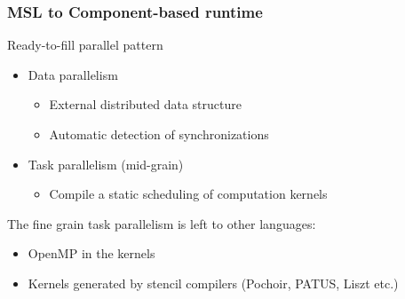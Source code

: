 \documentclass{beamer}
\begin{document}
\begin{frame}
\frametitle{MSL to Component-based runtime}
\begin{block}{Ready-to-fill parallel pattern}
\begin{itemize}
\item Data parallelism
\begin{itemize}
\item External distributed data structure
\item Automatic detection of synchronizations
\end{itemize}
\item Task parallelism (mid-grain)
\begin{itemize}
\item Compile a static scheduling of computation kernels
\end{itemize}
\end{itemize}
\end{block}
The fine grain task parallelism is left to other languages: 
\begin{itemize}
\item OpenMP in the kernels
\item Kernels generated by stencil compilers (Pochoir, PATUS, Liszt etc.)
\end{itemize}
\end{frame}
\end{document}
